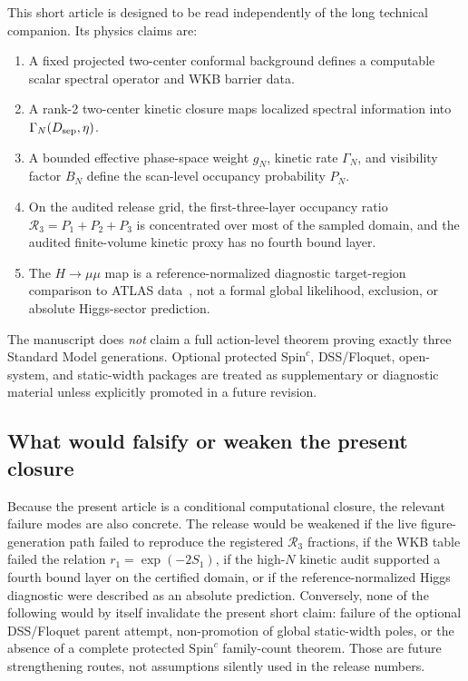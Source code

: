\documentclass[11pt,a4paper]{article}
\newcommand{\Rthree}{\mathcal{R}_3}
\newcommand{\Dsep}{D_{\rm sep}}
\begin{document}
This short article is designed to be read independently of the long technical companion.
Its physics claims are:
\begin{enumerate}
    \item A fixed projected two-center conformal background defines a computable scalar spectral operator and WKB barrier data.
    \item A rank-2 two-center kinetic closure maps localized spectral information into \(\Gamma_N(\Dsep,\eta)\).
    \item A bounded effective phase-space weight \(g_N\), kinetic rate \(\Gamma_N\), and visibility factor \(B_N\) define the scan-level occupancy probability \(P_N\).
    \item On the audited release grid, the first-three-layer occupancy ratio \(\Rthree=P_1+P_2+P_3\) is concentrated over most of the sampled domain, and the audited finite-volume kinetic proxy has no fourth bound layer.
    \item The \(H\to\mu\mu\) map is a reference-normalized diagnostic target-region comparison to ATLAS data~\cite{ATLAS_Hmumu}, not a formal global likelihood, exclusion, or absolute Higgs-sector prediction.
\end{enumerate}

The manuscript does \emph{not} claim a full action-level theorem proving exactly three Standard Model generations.
Optional protected \(\mathrm{Spin}^c\), DSS/Floquet, open-system, and static-width packages are treated as supplementary or diagnostic material unless explicitly promoted in a future revision.

\subsection{What would falsify or weaken the present closure}

Because the present article is a conditional computational closure, the relevant failure modes are also concrete.
The release would be weakened if the live figure-generation path failed to reproduce the registered \(\Rthree\) fractions, if the WKB table failed the relation \(r_1=\exp(-2S_1)\), if the high-\(N\) kinetic audit supported a fourth bound layer on the certified domain, or if the reference-normalized Higgs diagnostic were described as an absolute prediction.
Conversely, none of the following would by itself invalidate the present short claim: failure of the optional DSS/Floquet parent attempt, non-promotion of global static-width poles, or the absence of a complete protected \(\mathrm{Spin}^c\) family-count theorem.
Those are future strengthening routes, not assumptions silently used in the release numbers.
\end{document}

